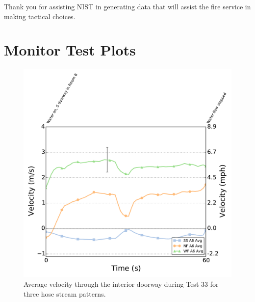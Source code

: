 \documentclass[12pt,oneside]{book}
\begin{document}
Thank you for assisting NIST in generating data that will assist the fire service in making tactical choices.





\appendix
\chapter{Monitor Test Plots}
\label{chap:monitor_plots}

\begin{figure}[!ht]
	\includegraphics[width=0.86\columnwidth]{../Figures/Plots/HOSE_IXXAXX_BDP_A6_stream_avgs}
	\caption{Average velocity through the interior doorway during Test 33 for three hose stream patterns.}
	\label{fig:Test_33_BDP_A6_Avg_All}
\end{figure}
\FloatBarrier
\end{document}
